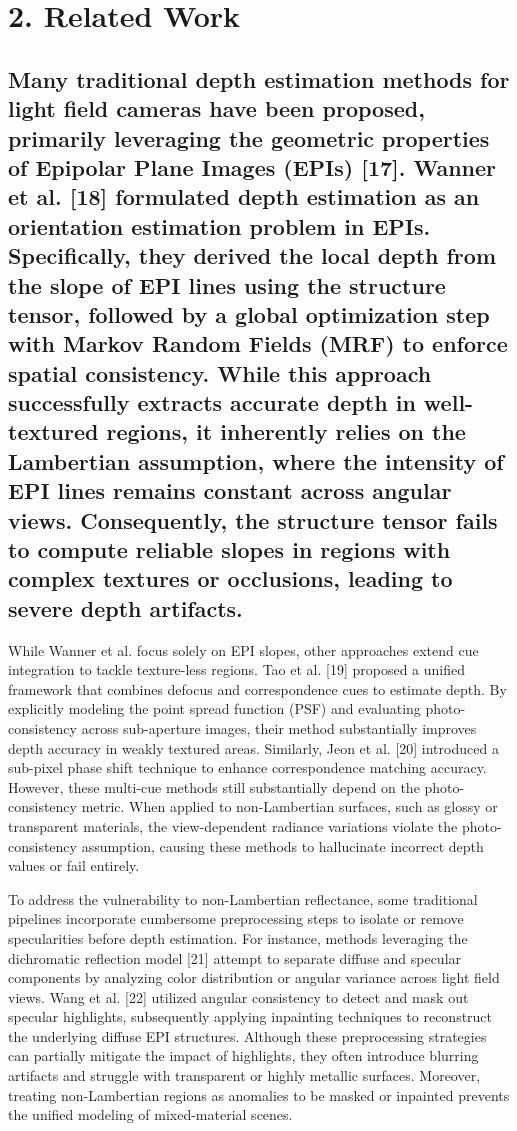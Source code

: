 \section{2. Related Work}

\subsection{Many traditional depth estimation methods for light field cameras have been proposed, primarily leveraging the geometric properties of Epipolar Plane Images (EPIs) [17]. Wanner et al. [18] formulated depth estimation as an orientation estimation problem in EPIs. Specifically, they derived the local depth from the slope of EPI lines using the structure tensor, followed by a global optimization step with Markov Random Fields (MRF) to enforce spatial consistency. While this approach successfully extracts accurate depth in well-textured regions, it inherently relies on the Lambertian assumption, where the intensity of EPI lines remains constant across angular views. Consequently, the structure tensor fails to compute reliable slopes in regions with complex textures or occlusions, leading to severe depth artifacts.}

While Wanner et al. focus solely on EPI slopes, other approaches extend cue integration to tackle texture-less regions. Tao et al. [19] proposed a unified framework that combines defocus and correspondence cues to estimate depth. By explicitly modeling the point spread function (PSF) and evaluating photo-consistency across sub-aperture images, their method substantially improves depth accuracy in weakly textured areas. Similarly, Jeon et al. [20] introduced a sub-pixel phase shift technique to enhance correspondence matching accuracy. However, these multi-cue methods still substantially depend on the photo-consistency metric. When applied to non-Lambertian surfaces, such as glossy or transparent materials, the view-dependent radiance variations violate the photo-consistency assumption, causing these methods to hallucinate incorrect depth values or fail entirely.

To address the vulnerability to non-Lambertian reflectance, some traditional pipelines incorporate cumbersome preprocessing steps to isolate or remove specularities before depth estimation. For instance, methods leveraging the dichromatic reflection model [21] attempt to separate diffuse and specular components by analyzing color distribution or angular variance across light field views. Wang et al. [22] utilized angular consistency to detect and mask out specular highlights, subsequently applying inpainting techniques to reconstruct the underlying diffuse EPI structures. Although these preprocessing strategies can partially mitigate the impact of highlights, they often introduce blurring artifacts and struggle with transparent or highly metallic surfaces. Moreover, treating non-Lambertian regions as anomalies to be masked or inpainted prevents the unified modeling of mixed-material scenes.


